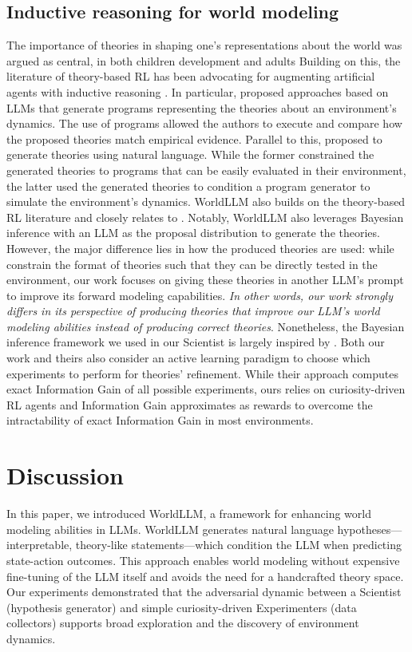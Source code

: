 \documentclass{article}
\begin{document}
\subsection{Inductive reasoning for world modeling} 
The importance of theories in shaping one's representations about the world was argued as central, in both children development and adults \citep{piaget_construction_1954,gopnik_scientist_1996}
Building on this, the literature of theory-based RL has been advocating for augmenting artificial agents with inductive reasoning \citep{tsividis_human-level_2021}. In particular, \citep{tsividis_human-level_2021, tang_worldcoder_2024, li_automated_2024} proposed approaches based on LLMs that generate programs representing the theories about an environment's dynamics. The use of programs allowed the authors to execute and compare how the proposed theories match empirical evidence. Parallel to this, \citep{piriyakulkij_doing_2024, wang_hypothesis_2023} proposed to generate theories using natural language. While the former constrained the generated theories to programs that can be easily evaluated in their environment, the latter used the generated theories to condition a program generator to simulate the environment's dynamics. WorldLLM also builds on the theory-based RL literature and closely relates to \citep{piriyakulkij_doing_2024}. Notably, WorldLLM also leverages Bayesian inference with an LLM as the proposal distribution to generate the theories. However, the major difference lies in how the produced theories are used: while \citep{piriyakulkij_doing_2024} constrain the format of theories such that they can be directly tested in the environment, our work focuses on giving these theories in another LLM's prompt to improve its forward modeling capabilities. \textit{In other words, our work strongly differs in its perspective of producing theories that improve our LLM's world modeling abilities instead of producing correct theories}. Nonetheless, the Bayesian inference framework we used in our Scientist is largely inspired by \citep{piriyakulkij_doing_2024}. Both our work and theirs also consider an active learning paradigm to choose which experiments to perform for theories' refinement. While their approach computes exact Information Gain of all possible experiments, ours relies on curiosity-driven RL agents and Information Gain approximates as rewards to overcome the intractability of exact Information Gain in most environments.

\section{Discussion}
In this paper, we introduced WorldLLM, a framework for enhancing world modeling abilities in LLMs. WorldLLM generates natural language hypotheses—interpretable, theory-like statements—which condition the LLM when predicting state-action outcomes. This approach enables world modeling without expensive fine-tuning of the LLM itself and avoids the need for a handcrafted theory space. Our experiments demonstrated that the adversarial dynamic between a Scientist (hypothesis generator) and simple curiosity-driven Experimenters (data collectors) supports broad exploration and the discovery of environment dynamics.
\end{document}
